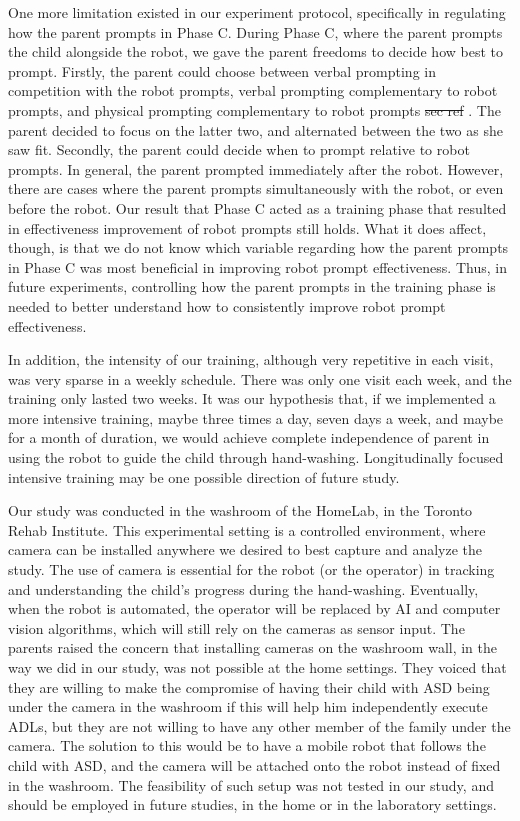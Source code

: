 \documentclass{ut-thesis}
\providecommand{\DIFdeltex}[1]{{\protect\color{red}\sout{#1}}}                      %
\providecommand{\DIFdelbegin}{} %
\providecommand{\DIFdelend}{} %
\providecommand{\DIFdel}[1]{\texorpdfstring{\DIFdeltex{#1}}{}} %
\begin{document}
One more limitation existed in our experiment protocol, specifically in regulating how the parent prompts in Phase C.  During Phase C, where the parent prompts the child alongside the robot, we gave the parent freedoms to decide how best to prompt.  Firstly, the parent could choose between verbal prompting in competition with the robot prompts, verbal prompting complementary to robot prompts, and physical prompting complementary to robot prompts\DIFdelbegin %
\DIFdel{sec ref}%
\DIFdelend .  The parent decided to focus on the latter two, and alternated between the two as she saw fit.  Secondly, the parent could decide when to prompt relative to robot prompts.  In general, the parent prompted immediately after the robot.  However, there are cases where the parent prompts simultaneously with the robot, or even before the robot.  Our result that Phase C acted as a training phase that resulted in effectiveness improvement of robot prompts still holds.  What it does affect, though, is that we do not know which variable regarding how the parent prompts in Phase C was most beneficial in improving robot prompt effectiveness.  Thus, in future experiments, controlling how the parent prompts in the training phase is needed to better understand how to consistently improve robot prompt effectiveness.

In addition, the intensity of our training, although very repetitive in each visit, was very sparse in a weekly schedule.  There was only one visit each week, and the training only lasted two weeks.  It was our hypothesis that, if we implemented a more intensive training, maybe three times a day, seven days a week, and maybe for a month of duration, we would achieve complete independence of parent in using the robot to guide the child through hand-washing.  Longitudinally focused intensive training may be one possible direction of future study.

Our study was conducted in the washroom of the HomeLab, in the Toronto Rehab Institute.  This experimental setting is a controlled environment, where camera can be installed anywhere we desired to best capture and analyze the study.  The use of camera is essential for the robot (or the operator) in tracking and understanding the child's progress during the hand-washing.  Eventually, when the robot is automated, the operator will be replaced by AI and computer vision algorithms, which will still rely on the cameras as sensor input.  The parents raised the concern that installing cameras on the washroom wall, in the way we did in our study, was not possible at the home settings.  They voiced that they are willing to make the compromise of having their child with ASD being under the camera in the washroom if this will help him independently execute ADLs, but they are not willing to have any other member of the family under the camera.  The solution to this would be to have a mobile robot that follows the child with ASD, and the camera will be attached onto the robot instead of fixed in the washroom.  The feasibility of such setup was not tested in our study, and should be employed in future studies, in the home or in the laboratory settings.
\end{document}
